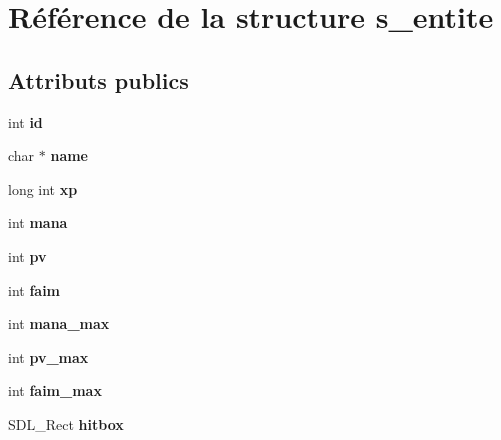 \hypertarget{structs__entite}{}\section{Référence de la structure s\+\_\+entite}
\label{structs__entite}
\subsection*{Attributs publics}
\begin{DoxyCompactItemize}
\item 
\mbox{\label{structs__entite_af923fde952cf1489094c25cc01e2265e}} 
int {\bfseries id}
\item 
\mbox{\label{structs__entite_a4411274c9b2162c48a5deecf9555f3b9}} 
char $\ast$ {\bfseries name}
\item 
\mbox{\label{structs__entite_ae6cb5d83e6ca7283d74db7ff17d911f0}} 
long int {\bfseries xp}
\item 
\mbox{\label{structs__entite_ad315e4304c73b41fbdd2460f8d60a3c1}} 
int {\bfseries mana}
\item 
\mbox{\label{structs__entite_afb1c28cff622019e4c84241432a1f18c}} 
int {\bfseries pv}
\item 
\mbox{\label{structs__entite_ab2988c2bdcedb380dc431e120605634d}} 
int {\bfseries faim}
\item 
\mbox{\label{structs__entite_a4be29a77ac79e7aee1f2c4e596820b9c}} 
int {\bfseries mana\+\_\+max}
\item 
\mbox{\label{structs__entite_a5bd2fe6d75e6aadbbf1ac0e234a2ca84}} 
int {\bfseries pv\+\_\+max}
\item 
\mbox{\label{structs__entite_a6d1a10ef05c8826c34b78d3e7c4ad549}} 
int {\bfseries faim\+\_\+max}
\item 
\mbox{\label{structs__entite_a3838ef605d756f3b912ec56aa1509949}} 
S\+D\+L\+\_\+\+Rect {\bfseries hitbox}
\item 

\end{DoxyCompactItemize}
